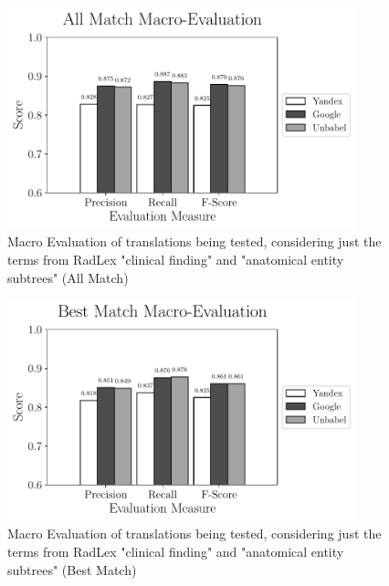 \begin{figure}[h]
	\centering
	\includegraphics[width=0.9\textwidth]{SupportFiles/plots/all_match_macro_clinical_anatomical_subtrees_plot.pdf}
	\caption{Macro Evaluation of translations being tested, considering just the terms from RadLex "clinical finding" and "anatomical entity subtrees" (All Match)}
	\label{app:macro_eval_subtrees_all}
\end{figure}


\begin{figure}[h]
	\centering
	\includegraphics[width=0.9\textwidth]{SupportFiles/plots/best_match_macro_clinical_anatomical_subtrees_plot.pdf}
	\caption{Macro Evaluation of translations being tested, considering just the terms from RadLex "clinical finding" and "anatomical entity subtrees" (Best Match)}
	\label{app:macro_eval_subtrees_best}
\end{figure}


